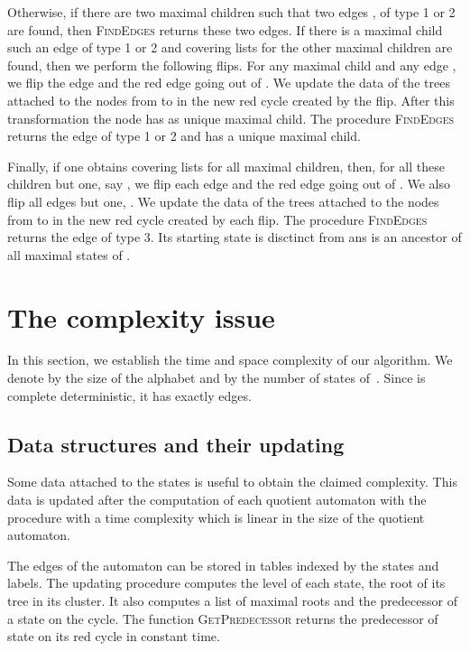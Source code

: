 \documentclass[11pt,a4paper]{article}
\begin{document}
Otherwise, if there are two maximal children  such
that two edges ,
 of type 1 or 2 are found, then
\textsc{FindEdges} returns these two edges.  If there is a
maximal child  such an edge  of type 1
or 2 and covering lists  for the other maximal children  are found, then we perform the following flips. For any maximal
child  and any edge , we flip the edge
 and the red edge going out of . We update the data of the
trees attached to the nodes from  to  in the new red cycle
created by the flip. After this transformation the node  has  as
unique maximal child. 
The procedure \textsc{FindEdges} returns the edge  of type 
1 or 2  and  has a unique maximal child.  

Finally, if one obtains covering lists for all maximal children, then,
for all these children  but one, say , we flip each edge
 and the red edge going out of . We also flip all
edges  but one, . We update the
data of the trees attached to the nodes from  to  in the new red
cycle created by each flip.  The procedure \textsc{FindEdges}
returns the edge  of type 3. Its starting state 
is disctinct from  ans is an ancestor of all maximal states of .




\section{The complexity issue} \label{section.complexity}

In this section, we establish the time and space complexity of our
algorithm. We denote by  the size of the alphabet  and by 
the number of states of~.  Since  is complete deterministic,
it has exactly  edges.


\subsection{Data structures and their updating} \label{section.update}

Some data attached to the states is useful to obtain the claimed
complexity.  This data is updated after the computation of each
quotient automaton with the procedure  with a time
complexity which is linear in the size of the quotient automaton.

The edges of the automaton can be stored in tables indexed by the
states and labels. The updating procedure computes the level of each
state, the root of its tree in its cluster.  It also computes a list
of maximal roots and the predecessor of a state on the cycle.  The
function \textsc{GetPredecessor} returns the predecessor of state
 on its red cycle in constant time.
\end{document}
